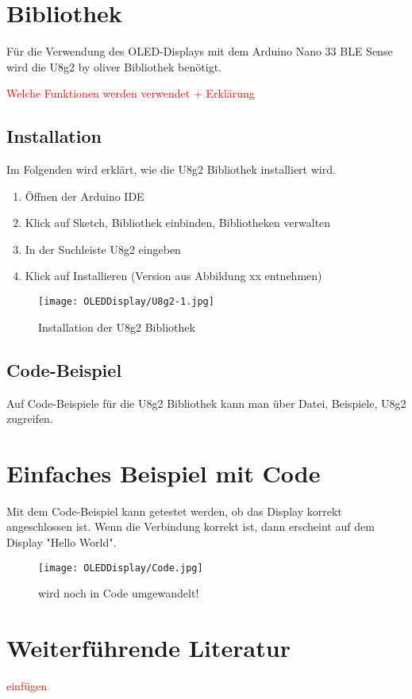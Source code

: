 \section{Bibliothek}

Für die Verwendung des OLED-Displays mit dem Arduino Nano 33 BLE Sense wird die U8g2 by oliver Bibliothek benötigt.

\textcolor{red}{Welche Funktionen werden verwendet + Erklärung}

\subsection{Installation}

Im Folgenden wird erklärt, wie die U8g2 Bibliothek installiert wird.

\begin{enumerate}
	\item Öffnen der Arduino IDE
	\item Klick auf Sketch, Bibliothek einbinden, Bibliotheken verwalten
	\item In der Suchleiste U8g2 eingeben
	\item Klick auf Installieren (Version aus Abbildung xx entnehmen)
\end{enumerate}

\begin{figure}[htpb]
	\centering
	\texttt{[image: OLEDDisplay/U8g2-1.jpg]}
	\caption{Installation der U8g2 Bibliothek}
	\label{fig:InstU8g2}
\end{figure}

\subsection{Code-Beispiel}

Auf Code-Beispiele für die U8g2 Bibliothek kann man über Datei, Beispiele, U8g2 zugreifen.

\section{Einfaches Beispiel mit Code}

Mit dem Code-Beispiel kann getestet werden, ob das Display korrekt angeschlossen ist. Wenn die Verbindung korrekt ist, dann erscheint auf dem Display "Hello World". 

\begin{figure}[htpb]
	\centering
	\texttt{[image: OLEDDisplay/Code.jpg]}
	\caption{wird noch in Code umgewandelt!}
	\label{fig:BeispielCodeDisplay}
\end{figure}

\section{Weiterführende Literatur}

\textcolor{red}{einfügen}

